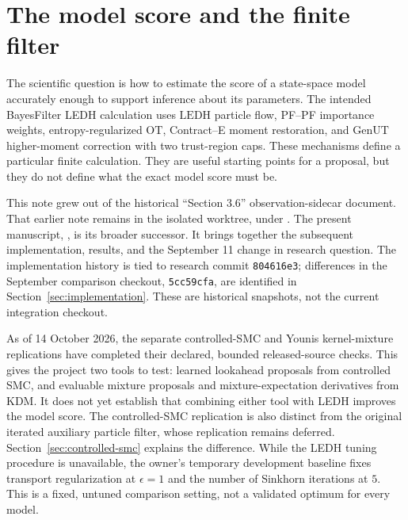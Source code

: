\documentclass[11pt]{article}
\newcommand{\LEDH}{\ensuremath{\mathrm{LEDH}}}
\newcommand{\GenUT}{\ensuremath{\mathrm{GenUT}}}
\newcommand{\OT}{\ensuremath{\mathrm{OT}}}
\begin{document}
\section{The model score and the finite filter}
\label{sec:question}

The scientific question is how to estimate the score of a state-space model
accurately enough to support inference about its parameters. The intended
BayesFilter LEDH calculation uses \LEDH{} particle flow, PF--PF importance weights,
entropy-regularized \OT{}, Contract--E moment restoration, and \GenUT{}
higher-moment correction with two trust-region caps. These mechanisms define
a particular finite calculation. They are useful starting points for a
proposal, but they do not define what the exact model score must be.

This note grew out of the historical ``Section 3.6'' observation-sidecar
document. That earlier note remains in the isolated
 worktree, under
. The present manuscript,
, is its
broader successor. It brings together the subsequent implementation, results,
and the September 11 change in research question. The implementation history
is tied to research commit \texttt{804616e3}; differences in the September
comparison checkout, \texttt{5cc59cfa}, are identified in
Section~\ref{sec:implementation}. These are historical snapshots, not the
current integration checkout.

As of 14 October 2026, the separate controlled-SMC and Younis kernel-mixture
replications have completed their declared, bounded released-source checks.
This gives the project two tools to test: learned lookahead proposals from
controlled SMC, and evaluable mixture proposals and mixture-expectation
derivatives from KDM. It does not yet establish that combining either tool
with LEDH improves the model score. The controlled-SMC replication is also
distinct from the original iterated auxiliary particle filter, whose
replication remains deferred. Section~\ref{sec:controlled-smc} explains the
difference. While the LEDH tuning procedure is unavailable, the owner's
temporary development baseline fixes transport regularization at
$\epsilon=1$ and the number of Sinkhorn iterations at $5$. This is a fixed,
untuned comparison setting, not a validated optimum for every model.
\end{document}
